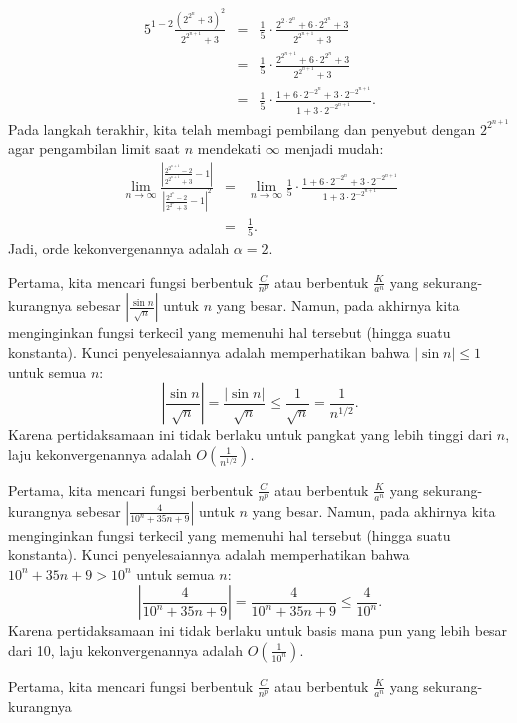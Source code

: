 \begin{description}
\begin{eqnarray*}
5^{1-2}\frac{\left(2^{2^{n}}+3\right)^{2}}{2^{2^{n+1}}+3} & = & \frac{1}{5}\cdot\frac{2^{2\cdot2^{n}}+6\cdot2^{2^{n}}+3}{2^{2^{n+1}}+3}\\
 & = & \frac{1}{5}\cdot\frac{2^{2^{n+1}}+6\cdot2^{2^{n}}+3}{2^{2^{n+1}}+3}\\
 & = & \frac{1}{5}\cdot\frac{1+6\cdot2^{-2^{n}}+3\cdot2^{-2^{n+1}}}{1+3\cdot2^{-2^{n+1}}}.
\end{eqnarray*}
Pada langkah terakhir, kita telah membagi pembilang dan penyebut dengan
$2^{2^{n+1}}$ agar pengambilan limit saat $n$ mendekati $\infty$
menjadi mudah:
\begin{eqnarray*}
\lim_{n\to\infty}\frac{\left|\frac{2^{2^{n+1}}-2}{2^{2^{n+1}}+3}-1\right|}{\left|\frac{2^{2^{n}}-2}{2^{2^{n}}+3}-1\right|^{2}} & = & \lim_{n\to\infty}\frac{1}{5}\cdot\frac{1+6\cdot2^{-2^{n}}+3\cdot2^{-2^{n+1}}}{1+3\cdot2^{-2^{n+1}}}\\
 & = & \frac{1}{5}.
\end{eqnarray*}
Jadi, orde kekonvergenannya adalah $\alpha=2$.
\item [{\ref{exc:convergence-3}:}] Pertama, kita mencari fungsi berbentuk
$\frac{C}{n^{p}}$ atau berbentuk $\frac{K}{a^{n}}$ yang sekurang-kurangnya
sebesar $\left|\frac{\sin n}{\sqrt{n}}\right|$ untuk $n$ yang besar.
Namun, pada akhirnya kita menginginkan fungsi terkecil yang memenuhi
hal tersebut (hingga suatu konstanta). Kunci penyelesaiannya adalah
memperhatikan bahwa $|\sin n|\leq1$ untuk semua $n$:
\[
\left|\frac{\sin n}{\sqrt{n}}\right|=\frac{|\sin n|}{\sqrt{n}}\leq\frac{1}{\sqrt{n}}=\frac{1}{n^{1/2}}.
\]
Karena pertidaksamaan ini tidak berlaku untuk pangkat yang lebih tinggi
dari $n$, laju kekonvergenannya adalah $O\left(\frac{1}{n^{1/2}}\right)$.
\item [{\ref{exc:convergence-4}:}] Pertama, kita mencari fungsi berbentuk
$\frac{C}{n^{p}}$ atau berbentuk $\frac{K}{a^{n}}$ yang sekurang-kurangnya
sebesar $\left|\frac{4}{10^{n}+35n+9}\right|$ untuk $n$ yang besar.
Namun, pada akhirnya kita menginginkan fungsi terkecil yang memenuhi
hal tersebut (hingga suatu konstanta). Kunci penyelesaiannya adalah
memperhatikan bahwa $10^{n}+35n+9>10^{n}$ untuk semua $n$:
\[
\left|\frac{4}{10^{n}+35n+9}\right|=\frac{4}{10^{n}+35n+9}\leq\frac{4}{10^{n}}.
\]
Karena pertidaksamaan ini tidak berlaku untuk basis mana pun yang
lebih besar dari 10, laju kekonvergenannya adalah $O\left(\frac{1}{10^{n}}\right)$.
\item [{\ref{exc:convergence-5}:}] Pertama, kita mencari fungsi berbentuk
$\frac{C}{n^{p}}$ atau berbentuk $\frac{K}{a^{n}}$ yang sekurang-kurangnya

\end{description}
